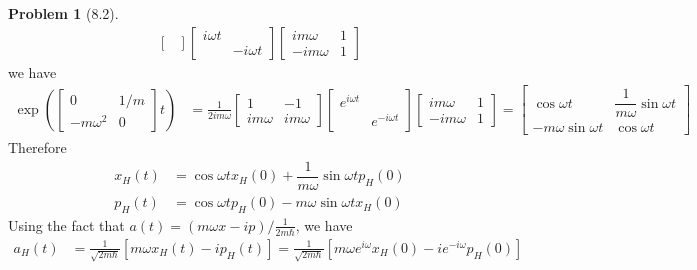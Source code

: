 \documentclass[twoside,11pt]{article}
\theoremstyle{definition}
\newtheorem{problem}{Problem}
\theoremstyle{remark}
\begin{document}
\begin{problem}[8.2]
\begin{align*}
\begin{bmatrix}
    \end{bmatrix}
    \begin{bmatrix}
        i\omega t & \\ & -i\omega t
    \end{bmatrix}
    \begin{bmatrix}
        im\omega & 1\\ -im\omega & 1
    \end{bmatrix}
\end{align*}
we have
\begin{align*}
    \exp\left(\begin{bmatrix}
        0 & 1/m\\ -m\omega^2 & 0
    \end{bmatrix}t \right)
    &= 
    \frac{1}{2im\omega}
    \begin{bmatrix}
        1 & -1 \\ im\omega & im\omega
    \end{bmatrix}
    \begin{bmatrix}
        e^{i\omega t} & \\ & e^{-i\omega t}
    \end{bmatrix}
    \begin{bmatrix}
        im\omega & 1\\ -im\omega & 1
    \end{bmatrix}
    = 
    \begin{bmatrix}
        \cos\omega t & \dfrac{1}{m\omega}\sin\omega t\\
        -m\omega\sin\omega t & \cos\omega t
    \end{bmatrix}
\end{align*}
Therefore
\begin{align*}
    x_H(t) &= \cos\omega t x_H(0) + \dfrac{1}{m\omega}\sin\omega t p_H(0)\\
    p_H(t) &= \cos\omega t p_H(0) - m\omega\sin\omega t x_H(0)
\end{align*}
Using the fact that $a(t)=(m\omega x - ip)/\frac{1}{2m\hbar}$, we have
\begin{align*}
    a_H(t) &= \frac{1}{\sqrt{2m\hbar}}[m\omega x_H(t) - ip_H(t)]
    = \frac{1}{\sqrt{2m\hbar}}[m\omega e^{i\omega}x_H(0) - ie^{-i\omega}p_H(0)]
\end{align*}

\end{problem}
\end{document}
